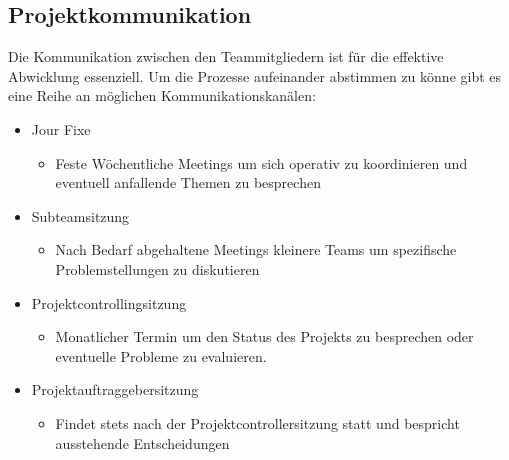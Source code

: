 \documentclass{article}
\begin{document}
	\subsection{Projektkommunikation}
	Die Kommunikation zwischen den Teammitgliedern ist für die effektive Abwicklung essenziell. Um die Prozesse aufeinander abstimmen zu könne gibt es eine Reihe an möglichen Kommunikationskanälen:
	\begin{itemize}
		\item{Jour Fixe}
		\begin{itemize}
			\item{Feste Wöchentliche Meetings um sich operativ zu koordinieren und eventuell anfallende Themen zu besprechen}
		\end{itemize}
		\item{Subteamsitzung}
		\begin{itemize}
			\item{Nach Bedarf abgehaltene Meetings kleinere Teams um spezifische Problemstellungen zu diskutieren}
		\end{itemize}
		\item{Projektcontrollingsitzung}
		\begin{itemize}
			\item{Monatlicher Termin um den Status des Projekts zu besprechen oder eventuelle Probleme zu evaluieren.}
		\end{itemize}
		\item{Projektauftraggebersitzung}
		\begin{itemize}
			\item{Findet stets nach der Projektcontrollersitzung statt und bespricht ausstehende Entscheidungen}
		\end{itemize}
	\end{itemize}





















  
\end{document}
